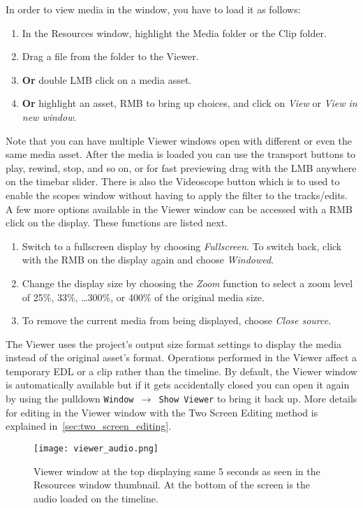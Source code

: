 In order to view media in the window, you have to load it as follows:

\begin{enumerate}
    \item  In the Resources window, highlight the Media folder or the Clip folder.
    \item  Drag a file from the folder to the Viewer.
    \item  \textbf{Or} double LMB click on a media asset.
    \item  \textbf{Or} highlight an asset, RMB to bring up choices, and click on \textit{View} or
\textit{View in new window}.
\end{enumerate}

Note that you can have multiple Viewer windows open with different or even the same media asset.
After the media is loaded you can use the transport buttons to play, rewind, stop, and so on, or
for fast previewing drag with the LMB anywhere on the timebar slider.  There is also the Videoscope
button which is to used to enable the scopes window without having to apply the filter to the tracks/edits.
A few more options available in the Viewer window can be accessed with a RMB click on the display.
These functions are listed next.

\begin{enumerate}
    \item  Switch to a fullscreen display by choosing \textit{Fullscreen}.  To switch back, click
with the RMB on the display again and choose \textit{Windowed}.
    \item  Change the display size by choosing the \textit{Zoom} function to select a zoom level of
25\%, 33\%, \ldots 300\%, or 400\% of the original media size.
    \item  To remove the current media from being displayed, choose \textit{Close source}.
\end{enumerate}

The Viewer uses the project's output size format settings to display the media instead of the
original asset's format. Operations performed in the Viewer affect a temporary EDL or a clip rather
than the timeline.  By default, the Viewer window is automatically available but if it gets
accidentally closed you can open it again by using the pulldown \texttt{Window $\rightarrow$ Show
Viewer} to bring it back up.  More details for editing in the Viewer window with the Two Screen
Editing method is explained in~\ref{sec:two_screen_editing}.


\begin{figure}[htpb]
    \centering
    \texttt{[image: viewer\_audio.png]}
    \caption{Viewer window at the top displaying same 5 seconds as seen in the Resources window thumbnail. At the bottom of the screen is the audio loaded on the timeline.}
    \label{fig:vieweraudio}
\end{figure}

